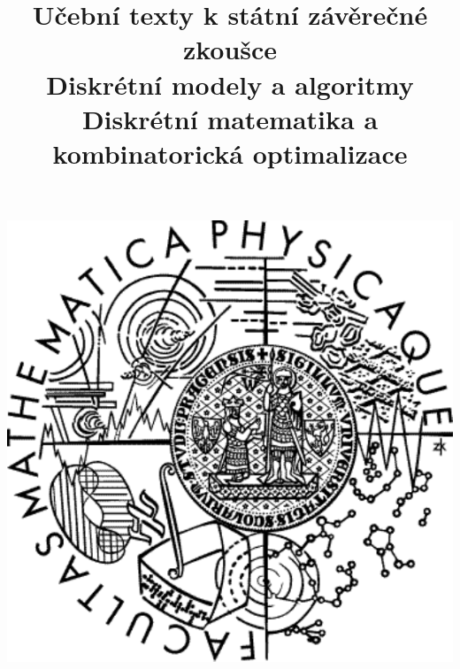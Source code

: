 \clearpage

\clearpage

\title{\LARGE Učební texty k státní závěrečné zkoušce \\ Diskrétní modely a algoritmy \\ Diskrétní matematika a kombinatorická optimalizace}




\maketitle

\vspace{10mm}
\begin{center}
\includegraphics[scale=0.5]{../common/logo.pdf}
\end{center} 

\clearpage

\clearpage

\tableofcontents







